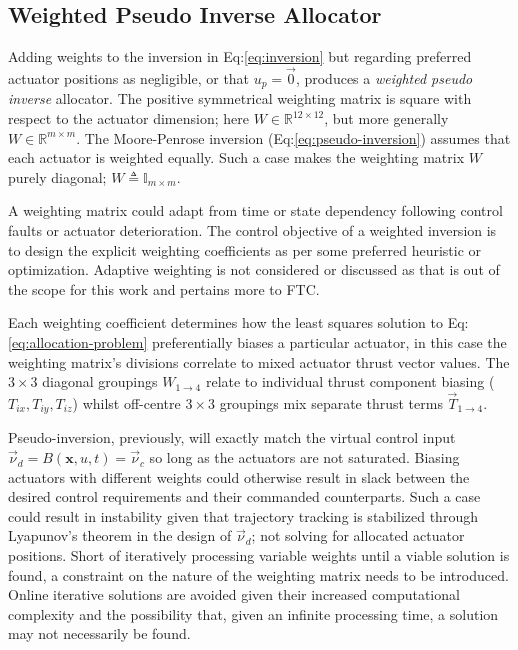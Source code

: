 \subsection{Weighted Pseudo Inverse Allocator}
\label{subsec:allocation.allocators.weightedinverse}
Adding weights to the inversion in Eq:\ref{eq:inversion} but regarding preferred actuator positions as negligible, or that $u_p=\vec{0}$, produces a \emph{weighted pseudo inverse} allocator. The positive symmetrical weighting matrix is square with respect to the actuator dimension; here $W\in\mathbb{R}^{12\times 12}$, but more generally $W\in\mathbb{R}^{m\times m}$. The Moore-Penrose inversion (Eq:\ref{eq:pseudo-inversion}) assumes that each actuator is weighted equally. Such a case makes the weighting matrix $W$ purely diagonal; $W\triangleq\mathbb{I}_{m\times m}$. 
\par
A weighting matrix could adapt from time or state dependency following control faults or actuator deterioration. The control objective of a weighted inversion is to design the explicit weighting coefficients as per some preferred heuristic or optimization. Adaptive weighting is not considered or discussed as that is out of the scope for this work and pertains more to FTC\cite{FTCallocation}.
\par
Each weighting coefficient determines how the least squares solution to Eq:\ref{eq:allocation-problem} preferentially biases a particular actuator, in this case the weighting matrix's divisions correlate to mixed actuator thrust vector values. The $3\times 3$ diagonal groupings $W_{1\rightarrow 4}$ relate to individual thrust component biasing ($T_{ix},T_{iy},T_{iz}$) whilst off-centre $3\times 3$ groupings mix separate thrust terms $\vec{T}_{1\rightarrow 4}$. 
\par
Pseudo-inversion, previously, will exactly match the virtual control input $\vec{\nu}_d=B(\mathbf{x},u,t)=\vec{\nu}_c$ so long as the actuators are not saturated. Biasing actuators with different weights could otherwise result in slack between the desired control requirements and their commanded counterparts. Such a case could result in instability given that trajectory tracking is stabilized through Lyapunov's theorem in the design of $\vec{\nu}_d$; not solving for allocated actuator positions. Short of iteratively processing variable weights until a viable solution is found, a constraint on the nature of the weighting matrix needs to be introduced. Online iterative solutions are avoided given their increased computational complexity and the possibility that, given an infinite processing time, a solution may not necessarily be found.
